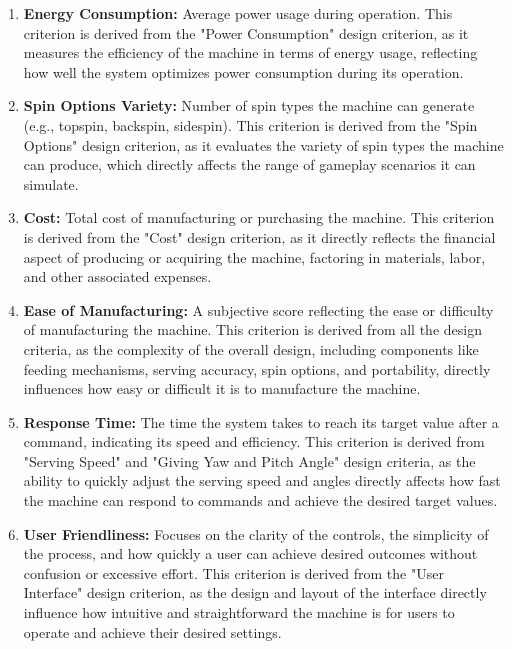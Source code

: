 \documentclass[12pt]{report}
\begin{document}
\begin{enumerate}
    \item \textbf{Energy Consumption:} Average power usage during operation. This criterion is derived from the "Power Consumption" design criterion, as it measures the efficiency of the machine in terms of energy usage, reflecting how well the system optimizes power consumption during its operation.

    \item \textbf{Spin Options Variety:} Number of spin types the machine can generate (e.g., topspin, backspin, sidespin). This criterion is derived from the "Spin Options" design criterion, as it evaluates the variety of spin types the machine can produce, which directly affects the range of gameplay scenarios it can simulate.

    \item \textbf{Cost:} Total cost of manufacturing or purchasing the machine. This criterion is derived from the "Cost" design criterion, as it directly reflects the financial aspect of producing or acquiring the machine, factoring in materials, labor, and other associated expenses.

    \item \textbf{Ease of Manufacturing:} A subjective score reflecting the ease or difficulty of manufacturing the machine. This criterion is derived from all the design criteria, as the complexity of the overall design, including components like feeding mechanisms, serving accuracy, spin options, and portability, directly influences how easy or difficult it is to manufacture the machine.

    \item \textbf{Response Time:} The time the system takes to reach its target value after a command, indicating its speed and efficiency. This criterion is derived from "Serving Speed" and "Giving Yaw and Pitch Angle" design criteria, as the ability to quickly adjust the serving speed and angles directly affects how fast the machine can respond to commands and achieve the desired target values.


    \item \textbf{User Friendliness:} Focuses on the clarity of the controls, the simplicity of the process, and how quickly a user can achieve desired outcomes without confusion or excessive effort. This criterion is derived from the "User Interface" design criterion, as the design and layout of the interface directly influence how intuitive and straightforward the machine is for users to operate and achieve their desired settings.



\end{enumerate}
\end{document}
